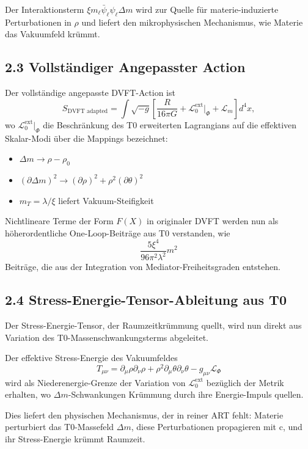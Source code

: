 	Der Interaktionsterm $\xi m_\ell \bar{\psi}_\ell \psi_\ell \Delta m$ wird zur Quelle für materie-induzierte Perturbationen in $\rho$ und liefert den mikrophysischen Mechanismus, wie Materie das Vakuumfeld krümmt.
	
	\subsection{2.3 Vollständiger Angepasster Action}
	
	Der vollständige angepasste DVFT-Action ist
	\[
	S_{\text{DVFT adapted}} = \int \sqrt{-g} \left[ \frac{R}{16\pi G} + \mathcal{L}_0^{\text{ext}} \big|_{\Phi} + \mathcal{L}_m \right] d^4x,
	\]
	wo $\mathcal{L}_0^{\text{ext}} \big|_{\Phi}$ die Beschränkung des T0 erweiterten Lagrangians auf die effektiven Skalar-Modi über die Mappings bezeichnet:
	\begin{itemize}
		\item $\Delta m \to \rho - \rho_0$
		\item $(\partial \Delta m)^2 \to (\partial \rho)^2 + \rho^2 (\partial \theta)^2$
		\item $m_T = \lambda / \xi$ liefert Vakuum-Steifigkeit
	\end{itemize}
	
	Nichtlineare Terme der Form $F(X)$ in originaler DVFT werden nun als höherordentliche One-Loop-Beiträge aus T0 verstanden, wie
	\[
	\frac{5\xi^4}{96\pi^2 \lambda^2} m^2
	\]
	Beiträge, die aus der Integration von Mediator-Freiheitsgraden entstehen.
	
	\subsection{2.4 Stress-Energie-Tensor-Ableitung aus T0}
	
	Der Stress-Energie-Tensor, der Raumzeitkrümmung quellt, wird nun direkt aus Variation des T0-Massenschwankungsterms abgeleitet.
	
	Der effektive Stress-Energie des Vakuumfeldes
	\[
	T_{\mu\nu} = \partial_\mu \rho \partial_\nu \rho + \rho^2 \partial_\mu \theta \partial_\nu \theta - g_{\mu\nu} \mathcal{L}_{\Phi}
	\]
	wird als Niederenergie-Grenze der Variation von $\mathcal{L}_0^{\text{ext}}$ bezüglich der Metrik erhalten, wo $\Delta m$-Schwankungen Krümmung durch ihre Energie-Impuls quellen.
	
	Dies liefert den physischen Mechanismus, der in reiner ART fehlt: Materie perturbiert das T0-Massefeld $\Delta m$, diese Perturbationen propagieren mit c, und ihr Stress-Energie krümmt Raumzeit.
	
